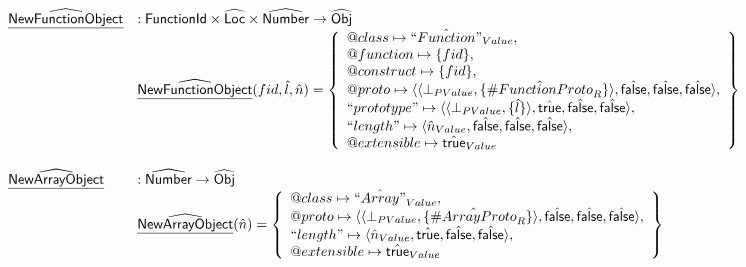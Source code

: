 \documentclass{article}
\makeatletter
\newcommand{\SF}[1]{\mbox{\textsf{#1}}}
\newcommand{\abs}[1]{\widehat{\SF{#1}}}
\newcommand{\aLoc}{\abs{Loc}}
\newcommand{\aObj}{\abs{Obj}}
\newcommand{\set}[1]{\left\{\begin{array}{l}#1\end{array}\right\}}
\newcommand{\fid}{\SF{FunctionId}}
\newcommand{\ahf}[1]{\widehat{\underline{\sf #1}}}
\newcommand{\varprop}[1]{@#1}
\newcommand{\avarloc}[1]{\hat{\##1}}
\newcommand{\atrue}{\hat{\SF{true}}}
\newcommand{\afalse}{\hat{\SF{false}}}
\makeatother
\begin{document}
\[\begin{array}{ll}
\ahf{NewFunctionObject} & : \fid \times \aLoc \times \abs{Number} \rightarrow \aObj \\
& \ahf{NewFunctionObject}(fid,\hat{l},\hat{n}) = \set{
    \varprop{class}\mapsto \hat{``Function"}_{Value},\\
   \varprop{function}\mapsto \{fid\},\\
   \varprop{construct}\mapsto \{fid\},\\
    \varprop{proto}\mapsto
      \langle\langle\bot_{PValue},\{\avarloc{FunctionProto}_R\}\rangle,\afalse,\afalse,\afalse\rangle,\\
    ``prototype"\mapsto
     \langle\langle\bot_{PValue},\{\hat{l}\}\rangle,\atrue,\afalse,\afalse\rangle,\\
    ``length"\mapsto
     \langle\hat{n}_{Value},\afalse,\afalse,\afalse\rangle,\\
  \varprop{extensible}\mapsto \atrue_{Value}
}\\\\

\ahf{NewArrayObject} & : \abs{Number} \rightarrow \aObj \\
& \ahf{NewArrayObject}(\hat{n}) = \set{
    \varprop{class}\mapsto \hat{``Array"}_{Value},\\
    \varprop{proto}\mapsto 
    \langle\langle\bot_{PValue},\{\avarloc{ArrayProto}_R\}\rangle,\afalse,\afalse,\afalse\rangle,\\
   ``length"\mapsto
   \langle\hat{n}_{Value},\atrue,\afalse,\afalse\rangle,\\
  \varprop{extensible}\mapsto \atrue_{Value}
}\\\\
\end{array}
\]
\end{document}
